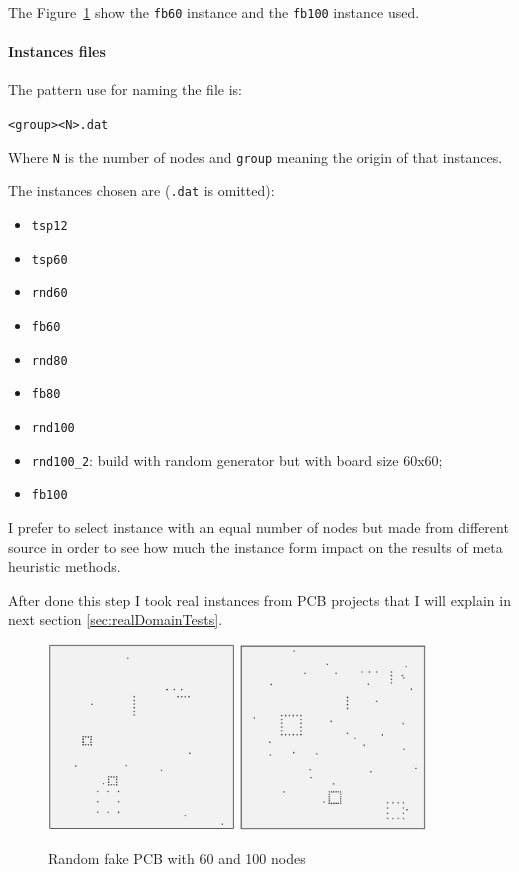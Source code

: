 	The Figure~\ref{fig:fakeBoards} show the \verb|fb60| instance and the \verb|fb100| instance used.
	
\newpage
	\paragraph{Instances files}
	The pattern use for naming the file is:
	\begin{center}
		\verb|<group><N>.dat|
	\end{center}
	Where \verb|N| is the number of nodes and \verb|group| meaning the origin of that instances.
	
	The instances chosen are (\verb|.dat| is omitted):
	\begin{itemize}
		\item \verb|tsp12|
		\item \verb|tsp60|
		\item \verb|rnd60|
		\item \verb|fb60|
		\item \verb|rnd80|
		\item \verb|fb80|
		\item \verb|rnd100|
		\item \verb|rnd100_2|: build with random generator but with board size 60x60;
		\item \verb|fb100|
	\end{itemize}
	I prefer to select instance with an equal number of nodes but made from different source in order to see how much the instance form impact on the results of meta heuristic methods.
	
	After done this step I took real instances from PCB projects that I will explain in next section \ref{sec:realDomainTests}. 

	\begin{figure}[hb]
		\centering
		\includegraphics[width=0.44\textwidth]{img/fb60}%
		\qquad\qquad
		\includegraphics[width=0.44\textwidth]{img/fb100}
		\caption{Random fake PCB with 60 and 100 nodes}
		\label{fig:fakeBoards}
	\end{figure}